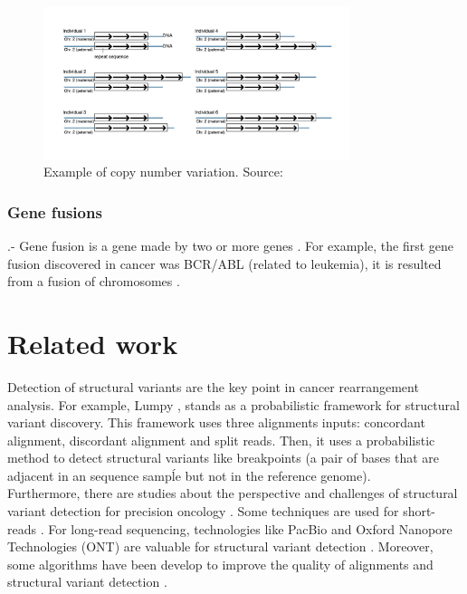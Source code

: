 \documentclass{svproc}
\begin{document}
\begin{figure}[h]
	\centering
	\includegraphics[width=0.8\textwidth]{img/splitthreader/copy_number_variation}
	\caption{Example of copy number variation. Source: \cite{cnv_nih_2021}}
	\label{fig:cnv}
\end{figure}



\subsubsection{Gene fusions}

.- Gene fusion is a gene made by two or more genes \cite{genefusion_nih_2021}. For example, the first gene
fusion discovered in cancer was BCR/ABL (related to leukemia), it is resulted from a fusion of chromosomes \cite{stam1985evidence}.

\section{Related work} 

Detection of structural variants are the key point in cancer rearrangement analysis. For example, Lumpy \cite{layer2014lumpy}, stands as a probabilistic framework for structural variant discovery. This framework uses three alignments inputs: concordant alignment, discordant alignment and split reads. Then, it uses a probabilistic method to detect structural variants like breakpoints (a pair of bases that are adjacent in an sequence sampĺe but not in the reference genome). \\

Furthermore, there are studies about the perspective and challenges of structural variant detection for precision oncology \cite{van2021structural}. Some techniques are used for short-reads \cite{ruffalo2011comparative, liu2015structural}. For long-read sequencing, technologies like PacBio and Oxford Nanopore Technologies (ONT) are valuable for structural variant detection \cite{de2019newest}. Moreover, some algorithms have been develop to improve the quality of alignments and structural variant detection \cite{rang2018squiggle, travers2010flexible}.\\
\end{document}
